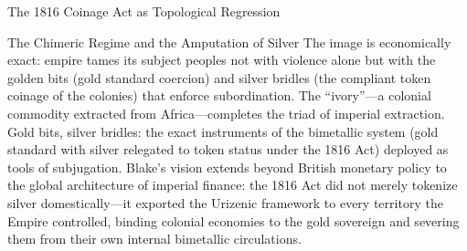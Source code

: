 \documentclass[
  ignorenonframetext,
]{beamer}
\begin{document}
\begin{frame}{The 1816 Coinage Act as Topological Regression}
\begin{block}{The Chimeric Regime and the Amputation of Silver}
The image is economically exact: empire tames its subject peoples not
with violence alone but with the golden bits (gold standard coercion)
and silver bridles (the compliant token coinage of the colonies) that
enforce subordination. The ``ivory''---a colonial commodity extracted
from Africa---completes the triad of imperial extraction. Gold bits,
silver bridles: the exact instruments of the bimetallic system (gold
standard with silver relegated to token status under the 1816 Act)
deployed as tools of subjugation. Blake's vision extends beyond British
monetary policy to the global architecture of imperial finance: the 1816
Act did not merely tokenize silver domestically---it exported the
Urizenic framework to every territory the Empire controlled, binding
colonial economies to the gold sovereign and severing them from their
own internal bimetallic circulations.


\end{block}
\end{frame}
\end{document}

